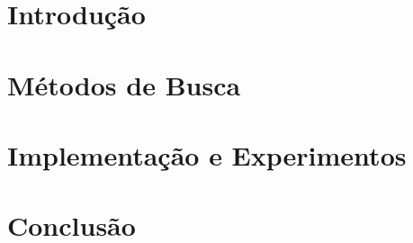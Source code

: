 \documentclass[a4paper,12pt,openany,twoside]{book}
\begin{document}
\singlespacing
{}



\listoffigures
\newpage

\tableofcontents
\newpage

\clearpage
{}
\onehalfspacing      %
\justifying          %

\chapter{Introdução}\label{cap:introducao}  
  
  
\chapter{Métodos de Busca}\label{cap:metodos}  
  
  
\chapter{Implementação e Experimentos}\label{cap:implementacao}  
  
  
\chapter{Conclusão}\label{cap:conclusao}  
  

\clearpage



% 

\printindex
\end{document}
